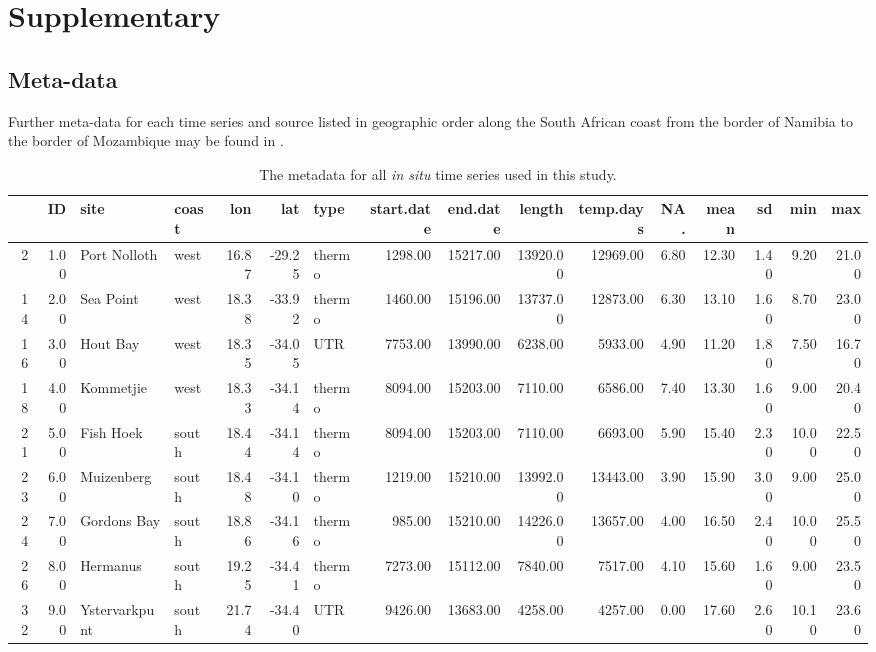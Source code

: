 \documentclass[a4paper,10pt,review]{elsarticle}
\begin{document}
\section{Supplementary}
\subsection{Meta-data}
Further meta-data for each time series and source listed in geographic order along the South African coast from the border of Namibia to the border of Mozambique may be found in .

\begin{table}[]
\caption{\small The metadata for all \emph{in situ} time series used in this study.}
\label{tableS1}
\centering
\tiny
\begin{tabular}{rrllrrlrrrrrrrrr}
  \hline
 & ID & site & coast & lon & lat & type & start.date & end.date & length & temp.days & NA. & mean & sd & min & max \\ 
  \hline
2 & 1.00 & Port Nolloth & west & 16.87 & -29.25 & thermo & 1298.00 & 15217.00 & 13920.00 & 12969.00 & 6.80 & 12.30 & 1.40 & 9.20 & 21.00 \\ 
  14 & 2.00 & Sea Point & west & 18.38 & -33.92 & thermo & 1460.00 & 15196.00 & 13737.00 & 12873.00 & 6.30 & 13.10 & 1.60 & 8.70 & 23.00 \\ 
  16 & 3.00 & Hout Bay & west & 18.35 & -34.05 & UTR & 7753.00 & 13990.00 & 6238.00 & 5933.00 & 4.90 & 11.20 & 1.80 & 7.50 & 16.70 \\ 
  18 & 4.00 & Kommetjie & west & 18.33 & -34.14 & thermo & 8094.00 & 15203.00 & 7110.00 & 6586.00 & 7.40 & 13.30 & 1.60 & 9.00 & 20.40 \\ 
  21 & 5.00 & Fish Hoek & south & 18.44 & -34.14 & thermo & 8094.00 & 15203.00 & 7110.00 & 6693.00 & 5.90 & 15.40 & 2.30 & 10.00 & 22.50 \\ 
  23 & 6.00 & Muizenberg & south & 18.48 & -34.10 & thermo & 1219.00 & 15210.00 & 13992.00 & 13443.00 & 3.90 & 15.90 & 3.00 & 9.00 & 25.00 \\ 
  24 & 7.00 & Gordons Bay & south & 18.86 & -34.16 & thermo & 985.00 & 15210.00 & 14226.00 & 13657.00 & 4.00 & 16.50 & 2.40 & 10.00 & 25.50 \\ 
  26 & 8.00 & Hermanus & south & 19.25 & -34.41 & thermo & 7273.00 & 15112.00 & 7840.00 & 7517.00 & 4.10 & 15.60 & 1.60 & 9.00 & 23.50 \\ 
  32 & 9.00 & Ystervarkpunt & south & 21.74 & -34.40 & UTR & 9426.00 & 13683.00 & 4258.00 & 4257.00 & 0.00 & 17.60 & 2.60 & 10.10 & 23.60 \\ 

\end{tabular}
\end{table}
\end{document}
